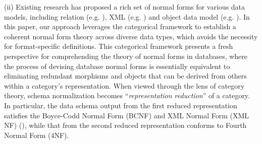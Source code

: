
 (ii)  Existing research has proposed a rich set of normal forms for various data models, including relation (e.g. \cite{journals/tods/Fagin77,fagin1979normal,fagin1981normal}), XML (e.g. \cite{DBLP:conf/pods/ArenasL03,journals/tods/VincentLL04}) and object data model (e.g. \cite{journals/tods/TariSS97}). In this paper, our approach leverages the categorical framework to establish a coherent normal form theory across diverse data types, which avoids the necessity for format-specific definitions. This categorical framework presents a fresh perspective for comprehending the theory of normal forms in databases, where the process of devising database normal forms is essentially equivalent to eliminating redundant morphisms and objects that can be derived from others within a category's representation.  When viewed through the lens of category theory, schema normalization becomes ``\textit{representation reduction}'' of a category. In particular, the data schema output from the first reduced representation satisfies the Boyce-Codd Normal Form (BCNF) and XML Normal Form (XML NF) (\cite{DBLP:conf/pods/ArenasL03}), while that from the second reduced representation conforms to  Fourth Normal Form (4NF).


 
 
